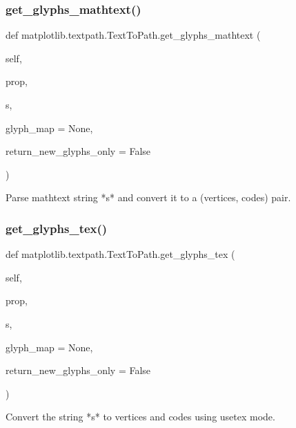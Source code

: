 \subsubsection{\texorpdfstring{get\+\_\+glyphs\+\_\+mathtext()}{get\_glyphs\_mathtext()}}
{\footnotesize\ttfamily def matplotlib.\+textpath.\+Text\+To\+Path.\+get\+\_\+glyphs\+\_\+mathtext (\begin{DoxyParamCaption}\item[{}]{self,  }\item[{}]{prop,  }\item[{}]{s,  }\item[{}]{glyph\+\_\+map = {\ttfamily None},  }\item[{}]{return\+\_\+new\+\_\+glyphs\+\_\+only = {\ttfamily False} }\end{DoxyParamCaption})}

\begin{DoxyVerb}Parse mathtext string *s* and convert it to a (vertices, codes) pair.
\end{DoxyVerb}
 \mbox{\label{classmatplotlib_1_1textpath_1_1TextToPath_a392bb2358484531bbaf91bb5cddd9a7d}} 
\subsubsection{\texorpdfstring{get\+\_\+glyphs\+\_\+tex()}{get\_glyphs\_tex()}}
{\footnotesize\ttfamily def matplotlib.\+textpath.\+Text\+To\+Path.\+get\+\_\+glyphs\+\_\+tex (\begin{DoxyParamCaption}\item[{}]{self,  }\item[{}]{prop,  }\item[{}]{s,  }\item[{}]{glyph\+\_\+map = {\ttfamily None},  }\item[{}]{return\+\_\+new\+\_\+glyphs\+\_\+only = {\ttfamily False} }\end{DoxyParamCaption})}

\begin{DoxyVerb}Convert the string *s* to vertices and codes using usetex mode.\end{DoxyVerb}
 \mbox{\label{classmatplotlib_1_1textpath_1_1TextToPath_a24979a16a01326cc459e5896af04789c}} 
